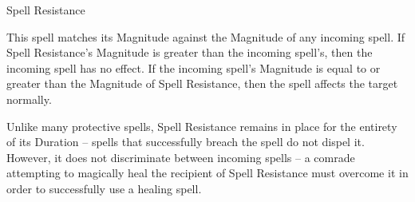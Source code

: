 \begin{rpg-spell}
{Spell Resistance}
{}

This spell matches its Magnitude against the Magnitude of any incoming spell. If Spell Resistance’s Magnitude is greater than the incoming spell’s, then the incoming spell has no effect. If the incoming spell’s Magnitude is equal to or greater than the Magnitude of Spell Resistance, then the spell affects the target normally. 

Unlike many protective spells, Spell Resistance remains in place for the entirety of its Duration – spells that successfully breach the spell do not dispel it. However, it does not discriminate between incoming spells – a comrade attempting to magically heal the recipient of Spell Resistance must overcome it in order to successfully use a healing spell. 
\end{rpg-spell}


